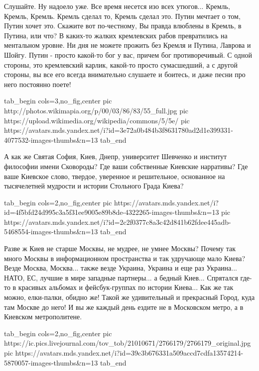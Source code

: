 Слушайте. Ну надоело уже. Все время несется изо всех утюгов... Кремль, Кремль,
Кремль. Кремль сделал то, Кремль сделал это. Путин мечтает о том, Путин хочет
это. Скажите вот по-честному, Вы правда влюблены в Кремль, в Путина, или что? В
каких-то жалких кремлевских рабов превратились на ментальном уровне. Ни дня не
можете прожить без Кремля и Путина, Лаврова и Шойгу. Путин - просто какой-то
бог у вас, причем бог противоречивый. С одной стороны, это кремлевский карлик,
какой-то просто сумасшедший, а с другой стороны, вы все его всегда внимательно
слушаете и боитесь, и даже песни про него постоянно поете!

\ifcmt
  tab_begin cols=3,no_fig,center
     pic http://photos.wikimapia.org/p/00/03/86/83/55_full.jpg
		 pic https://upload.wikimedia.org/wikipedia/commons/5/5e/%
		 pic https://avatars.mds.yandex.net/i?id=3e72a0b484b3f8631780ad2d1e399331-4077532-images-thumbs&n=13 
  tab_end
\fi

А как же Святая София, Киев, Днепр, университет Шевченко и институт
философии имени Сковороды? Где ваши собственные Киевские нарративы? Где ваше
Киевское слово, твердое, уверенное и решительное, основанное на тысячелетней
мудрости и истории Стольного Града Киева? 

\ifcmt
  tab_begin cols=2,no_fig,center
     pic https://avatars.mds.yandex.net/i?id=4f5bfd24d995c3a5f31ee9005e89b8de-4322265-images-thumbs&n=13
		 pic https://avatars.mds.yandex.net/i?id=2c2f0377c8a3c42d841b62fdee445adb-5468554-images-thumbs&n=13
  tab_end
\fi

Разве ж Киев не старше Москвы, не
мудрее, не умнее Москвы?  Почему так много Москвы в информационном пространства
и так удручающе мало Киева? Везде Москва, Москва... также везде Украина,
Украина и еще раз Украина... НАТО, ЕС, лучшие в мире западные партнеры...  а
бедный Киев... Спрятался где-то в красивых альбомах и фейсбук-группах по
истории Киева... Как же так можно, елки-палки, обидно же! Такой же удивительный
и прекрасный Город, куда там Москве до него!  И вы же каждый день ездите не в
Московском метро, а в Киевском метрополитене.

\ifcmt
  tab_begin cols=2,no_fig,center
		 pic https://ic.pics.livejournal.com/tov_tob/21010671/2766179/2766179_original.jpg
		 pic https://avatars.mds.yandex.net/i?id=39c3b676331a509accd7cdfa13574214-5870057-images-thumbs&n=13
  tab_end
\fi

